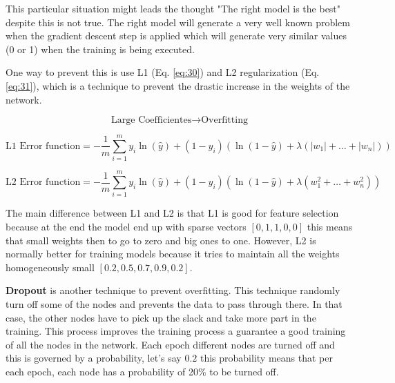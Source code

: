 \documentclass{article}
\begin{document}
This particular situation might leads the thought "The right model is the best" despite this is not true. The right model will generate a very well known problem when the gradient descent step is applied which will generate very similar values (0 or 1) when the training is being executed.

One way to prevent this is use L1 (Eq. \eqref{eq:30}) and L2 regularization (Eq. \eqref{eq:31}), which is a technique to prevent the drastic increase in the weights of the network.

\[\text{Large Coefficientes} \rightarrow \text{Overfitting}\]

\begin{equation}
\label{eq:30}
\text{L1 Error function} = - \frac{1}{m} \sum_{i=1}^m y_i\ln{(\hat{y})} + (1 - y_i) (\ln{(1 - \hat{y})} + \lambda (|w_1|+\dots+|w_n|))
\end{equation}

\begin{equation}
\label{eq:31}
\text{L2 Error function} = - \frac{1}{m} \sum_{i=1}^m y_i\ln{(\hat{y})} + (1 - y_i) (\ln{(1 - \hat{y})} + \lambda (w_1^2+\dots+w_n^2))
\end{equation}

The main difference between L1 and L2 is that L1 is good for feature selection because at the end the model end up with sparse vectors \([0,1,1,0,0]\) this means that small weights then to go to zero and big ones to one. However, L2 is normally better for training models because it tries to maintain all the weights homogeneously small \([0.2, 0.5, 0.7 ,0.9, 0.2]\).

\textbf{Dropout} is another technique to prevent overfitting. This technique randomly turn off some of the nodes and prevents the data to pass through there. In that case, the other nodes have to pick up the slack and take more part in the training. This process improves the training process a guarantee a good training of all the nodes in the network. Each epoch different nodes are turned off and this is governed by a probability, let's say \(0.2\) this probability means that per each epoch, each node has a probability of 20\% to be turned off. 



\printbibliography
\end{document}
